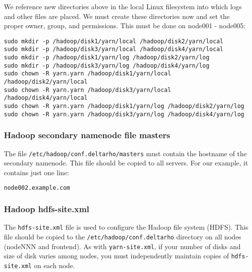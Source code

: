 We reference new directories above in the local Linux filesystem into which
logs and other files are placed.  We must create these directories now
and set the proper owner, group, and permissions.  This must be done on
node001 - node005:

\begin{verbatim}
sudo mkdir -p /hadoop/disk1/yarn/local /hadoop/disk2/yarn/local
sudo mkdir -p /hadoop/disk3/yarn/local /hadoop/disk4/yarn/local
sudo mkdir -p /hadoop/disk1/yarn/log /hadoop/disk2/yarn/log
sudo mkdir -p /hadoop/disk3/yarn/log /hadoop/disk4/yarn/log
sudo chown -R yarn.yarn /hadoop/disk1/yarn/local /hadoop/disk2/yarn/local
sudo chown -R yarn.yarn /hadoop/disk3/yarn/local /hadoop/disk4/yarn/local
sudo chown -R yarn.yarn /hadoop/disk1/yarn/log /hadoop/disk2/yarn/log
sudo chown -R yarn.yarn /hadoop/disk3/yarn/log /hadoop/disk4/yarn/log
\end{verbatim}

\subsubsection{Hadoop secondary namenode file masters}
The file \verb|/etc/hadoop/conf.deltarho/masters| must contain the hostname
of the secondary namenode.  This file should be copied to all servers.
For our example, it contains just one line:

\begin{verbatim}
node002.example.com
\end{verbatim}

\subsubsection{Hadoop hdfs-site.xml}
The \verb|hdfs-site.xml| file is used to configure the
Hadoop file system (HDFS).   This file should be copied to the
\verb|/etc/hadoop/conf.deltarho| directory on all nodes (nodeNNN and
frontend).  As with \verb|yarn-site.xml|, if your number of disks and
size of disk varies among nodes, you must independently maintain copies
of \verb|hdfs-site.xml| on each node.


